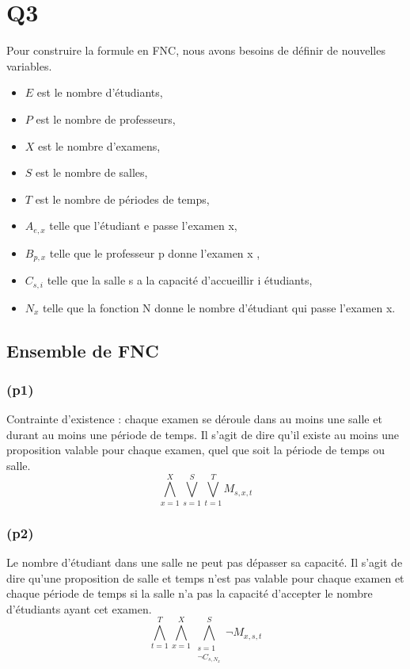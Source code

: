 \documentclass[a4paper,11pt]{article}
\begin{document}
\section{Q3}
Pour construire la formule en FNC, nous avons besoins de définir de nouvelles variables.
\begin{itemize}
    \item \(E\) est le nombre d'étudiants,
    \item \(P\) est le nombre de professeurs,
    \item \(X\) est le nombre d'examens,
    \item \(S\) est le nombre de salles,
    \item \(T\) est le nombre de périodes de temps,
	\item \( A_{e,x}\) telle que l'étudiant e passe l'examen x,
	\item \(B_{p,x}\) telle que le professeur p donne l'examen x ,
	\item \(C_{s,i}\) telle que la salle s a la capacité d'accueillir i étudiants,
	\item \(N_{x}\) telle que la fonction N donne le nombre d'étudiant qui passe l'examen x.
\end{itemize}


\subsection{Ensemble de FNC}
\subsubsection{(p1)}
Contrainte d'existence : chaque examen se déroule dans au moins une salle et durant au moins une période de temps.
Il s'agit de dire qu'il existe au moins une proposition valable pour chaque examen, quel que soit la période de temps ou salle.
\begin{displaymath}
	\bigwedge\limits_{x=1}^{X}\bigvee\limits_{s=1}^{S}\bigvee\limits_{t=1}^{T} M_{s,x,t}
\end{displaymath}


\subsubsection{(p2)}
Le nombre d'étudiant dans une salle ne peut pas dépasser sa capacité.
Il s'agit de dire qu'une proposition de salle et temps n'est pas valable pour chaque examen et chaque période de temps si la salle n'a pas la capacité d'accepter le nombre d'étudiants ayant cet examen.
\begin{displaymath}
	\bigwedge\limits_{t=1}^{T}\bigwedge\limits_{x=1}^{X}\bigwedge\limits_{\substack{s=1 \\ \neg C_{s,N_{x}}}}^{S}  \neg M_{x,s,t}
\end{displaymath}
\end{document}
